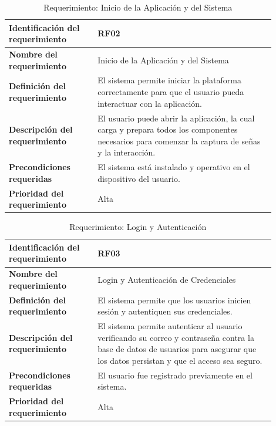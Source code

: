 \begin{table}[H]
    \centering
    \begin{tabular}{|p{0.3\linewidth}|p{0.6\linewidth}|}
        \hline
        \textbf{Identificación del requerimiento} & RF02 \\
        \hline
        \textbf{Nombre del requerimiento} & Inicio de la Aplicación y del Sistema \\
        \hline
        \textbf{Definición del requerimiento} & El sistema permite iniciar la plataforma correctamente para que el usuario pueda interactuar con la aplicación. \\
        \hline
        \textbf{Descripción del requerimiento} & El usuario puede abrir la aplicación, la cual carga y prepara todos los componentes necesarios para comenzar la captura de señas y la interacción. \\
        \hline
        \textbf{Precondiciones requeridas} & El sistema está instalado y operativo en el dispositivo del usuario. \\
        \hline
        \textbf{Prioridad del requerimiento} & Alta \\
        \hline
    \end{tabular}
    \caption{Requerimiento: Inicio de la Aplicación y del Sistema}
    \label{tab:rf-inicio-app}
\end{table}

\begin{table}[H]
    \centering
    \begin{tabular}{|p{0.3\linewidth}|p{0.6\linewidth}|}
        \hline
        \textbf{Identificación del requerimiento} & RF03 \\
        \hline
        \textbf{Nombre del requerimiento} & Login y Autenticación de Credenciales \\
        \hline
        \textbf{Definición del requerimiento} & El sistema permite que los usuarios inicien sesión y autentiquen sus credenciales. \\
        \hline
        \textbf{Descripción del requerimiento} & El sistema permite autenticar al usuario verificando su correo y contraseña contra la base de datos de usuarios para asegurar que los datos persistan y que el acceso sea seguro. \\
        \hline
        \textbf{Precondiciones requeridas} & El usuario fue registrado previamente en el sistema. \\
        \hline
        \textbf{Prioridad del requerimiento} & Alta \\
        \hline
    \end{tabular}
    \caption{Requerimiento: Login y Autenticación}
    \label{tab:rf-login}
\end{table}

